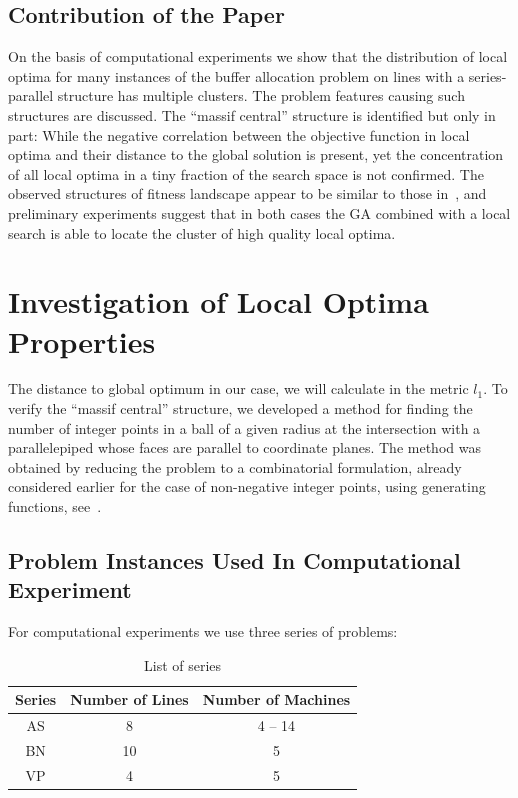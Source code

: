 \documentclass{ifacconf}
\begin{document}
\subsection{Contribution of the Paper}
On the basis of computational experiments we show that the distribution of local optima for many instances of the buffer allocation 
problem on lines with a series-parallel structure has multiple clusters. The problem features causing such structures
are discussed. The ``massif central'' structure is identified but only in part: 
While the negative correlation between the objective function in local optima and their distance to the global solution is present, yet the 
concentration of all 
local optima in a tiny fraction of the search space is not confirmed. The observed structures of fitness landscape appear to be similar 
to those in~\citep{Hains}, and preliminary experiments suggest that  in both cases the GA combined with a local search 
is able to locate the cluster of high quality local optima.

\section{Investigation of Local Optima Properties} \label{investigation}

The distance to global optimum
in our case, we will calculate in the metric $l_1$.
To verify the ``massif central'' structure, we developed a method 
for finding the number of integer points in
a ball of a given radius at the intersection with a parallelepiped
whose faces are parallel to coordinate planes.
The method
was obtained by reducing the problem to a combinatorial
formulation, already considered earlier for the case of non-negative
integer points, using
generating functions, see~\cite{Sach}.

\subsection{Problem Instances Used In Computational Experiment}\label{subsec:tasks}
For computational experiments we use three series of problems:
\begin{table}[!ht]
\centering
\small
\begin{tabular}{|c|c|c|}
\hline
Series&Number of Lines&Number of Machines\\
\hline
AS & 8 & 4 -- 14 \\
BN & 10 & 5 \\
VP & 4 & 5 \\
\hline
\end{tabular}
\caption{List of series}\label{tabl:series}
\vspace{-0.5cm}
\end{table}
\end{document}
